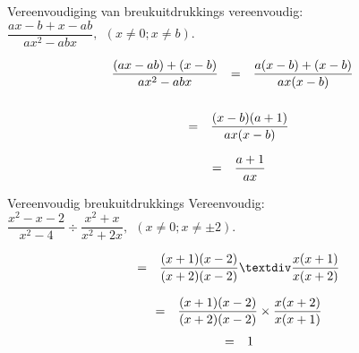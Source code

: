 
\begin{wex}{ Vereenvoudiging van breukuitdrukkings }{vereenvoudig: $\dfrac{ax-b+x-ab}{a{x}^{2}-abx}, ~~(x \neq 0;x \neq b)$.}
{
\par 
\begin{equation*}
\begin{array}{lll}\dfrac{(ax-ab)+(x-b)}{a{x}^{2}-abx}\hfill & =& \dfrac{a(x-b)+(x-b)}{ax(x-b)}\hfill \\ \end{array}
\end{equation*}
\begin{equation*}
\begin{array}{lll}
\\& =& \dfrac{(x-b)(a+1)}{ax(x-b)}\hfill \end{array}
\end{equation*}

\begin{equation*}
\begin{array}{ccc}& =& \dfrac{a+1}{ax}\hfill \end{array}
\end{equation*}
}
\end{wex}


\begin{wex}{Vereenvoudig breukuitdrukkings }
{Vereenvoudig: $\dfrac{{x}^{2}-x-2}{{x}^{2}-4}÷\dfrac{{x}^{2}+x}{{x}^{2}+2x}, ~~(x \neq 0;x \neq \pm2)$.} 
{
\begin{equation*}
\begin{array}{ccc}& =& \dfrac{(x+1)(x-2)}{(x+2)(x-2)}÷\dfrac{x(x+1)}{x(x+2)}\hfill \end{array}
\end{equation*}


\begin{equation*}
\begin{array}{ccc}& =& \dfrac{(x+1)(x-2)}{(x+2)(x-2)}\ensuremath{\times}\dfrac{x(x+2)}{x(x+1)}\hfill \end{array}
\end{equation*}
\begin{equation*}
\begin{array}{ccc}& =& 1\hfill \end{array}
\end{equation*}
}
\end{wex}


